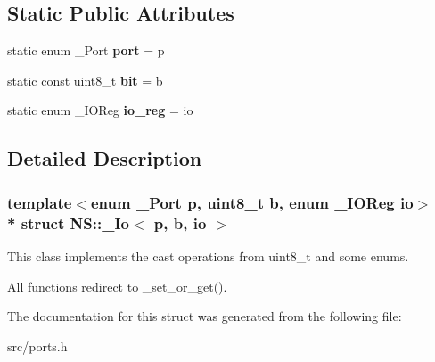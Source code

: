 \subsection*{Static Public Attributes}
\begin{DoxyCompactItemize}
\item 
static enum \+\_\+\+Port {\bfseries port} = p\hypertarget{structNS_1_1__Io_abada532b0d795fc6a027707986cee08d}{}\label{structNS_1_1__Io_abada532b0d795fc6a027707986cee08d}

\item 
static const uint8\+\_\+t {\bfseries bit} = b\hypertarget{structNS_1_1__Io_a8dd0ce20c31c6cbe15a1b7c5d8c23c70}{}\label{structNS_1_1__Io_a8dd0ce20c31c6cbe15a1b7c5d8c23c70}

\item 
static enum \+\_\+\+I\+O\+Reg {\bfseries io\+\_\+reg} = io\hypertarget{structNS_1_1__Io_a5a6c8c7439774f40e904818772dae0fb}{}\label{structNS_1_1__Io_a5a6c8c7439774f40e904818772dae0fb}

\end{DoxyCompactItemize}


\subsection{Detailed Description}
\subsubsection*{template$<$enum \+\_\+\+Port p, uint8\+\_\+t b, enum \+\_\+\+I\+O\+Reg io$>$\\*
struct N\+S\+::\+\_\+\+Io$<$ p, b, io $>$}

This class implements the cast operations from uint8\+\_\+t and some enums. 

All functions redirect to \+\_\+set\+\_\+or\+\_\+get(). 

The documentation for this struct was generated from the following file\+:\begin{DoxyCompactItemize}
\item 
src/ports.\+h\end{DoxyCompactItemize}
